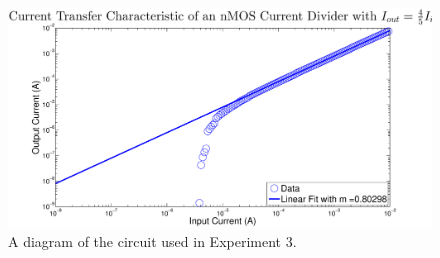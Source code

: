 \begin{figure}[H]
\centering
\includegraphics[width=\linewidth]{../Figures/Experiment3Figure2.eps}
\caption{A diagram of the circuit used in Experiment 3.}
\label{fig:exp3p2}
\end{figure}
